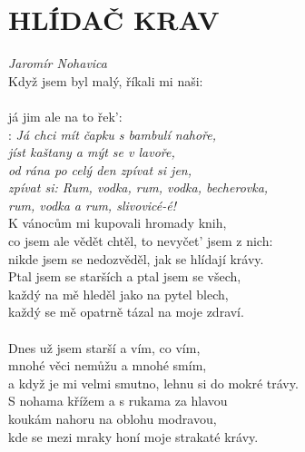 \section*{\Huge HLÍDAČ KRAV}
\emph{Jaromír Nohavica}\\

Když jsem byl malý, říkali mi naši:\\
\\
já jim ale na to řek': \\

\textregistered: \emph{Já chci mít čapku s bambulí nahoře,\\
jíst kaštany a mýt se v lavoře,\\
od rána po celý den zpívat si jen,\\
zpívat si: Rum, vodka, rum, vodka, becherovka,\\
rum, vodka a rum, slivovicé-é!}\\

K vánocům mi kupovali hromady knih,\\
co jsem ale vědět chtěl, to nevyčet' jsem z nich:\\
nikde jsem se nedozvěděl, jak se hlídají krávy.\\
Ptal jsem se starších a ptal jsem se všech,\\
každý na mě hleděl jako na pytel blech,\\
každý se mě opatrně tázal na moje zdraví.\\
\textregistered\\

Dnes už jsem starší a vím, co vím,\\
mnohé věci nemůžu a mnohé smím,\\
a když je mi velmi smutno, lehnu si do mokré trávy.\\
S nohama křížem a s rukama za hlavou\\
koukám nahoru na oblohu modravou,\\
kde se mezi mraky honí moje strakaté krávy.\\

\textregistered

\newpage
